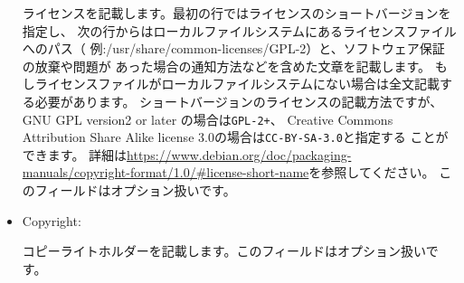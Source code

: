 \documentclass[mingoth,a4paper]{jsarticle}
\begin{document}
\begin{itemize}
         ライセンスを記載します。最初の行ではライセンスのショートバージョンを指定し、
         次の行からはローカルファイルシステムにあるライセンスファイルへのパス（
         例:/usr/share/common-licenses/GPL-2）と、ソフトウェア保証の放棄や問題が
         あった場合の通知方法などを含めた文章を記載します。
         もしライセンスファイルがローカルファイルシステムにない場合は全文記載す
         る必要があります。
         ショートバージョンのライセンスの記載方法ですが、GNU GPL version2 or later の場合は\texttt{GPL-2+}、
         Creative Commons Attribution Share Alike license 3.0の場合は\texttt{CC-BY-SA-3.0}と指定する
         ことができます。
         詳細は\url{https://www.debian.org/doc/packaging-manuals/copyright-format/1.0/#license-short-name}を参照してください。
         このフィールドはオプション扱いです。

  \item  Copyright:

         コピーライトホルダーを記載します。このフィールドはオプション扱いです。

\end{itemize}
\end{document}
